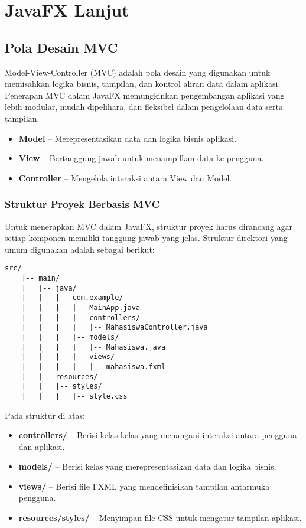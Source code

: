 \chapter{JavaFX Lanjut}

\section{Pola Desain MVC}

Model-View-Controller (MVC) adalah pola desain yang digunakan untuk memisahkan logika bisnis, tampilan, dan kontrol aliran data dalam aplikasi. Penerapan MVC dalam JavaFX memungkinkan pengembangan aplikasi yang lebih modular, mudah dipelihara, dan fleksibel dalam pengelolaan data serta tampilan.

\begin{itemize}
	\item \textbf{Model} – Merepresentasikan data dan logika bisnis aplikasi.
	\item \textbf{View} – Bertanggung jawab untuk menampilkan data ke pengguna.
	\item \textbf{Controller} – Mengelola interaksi antara View dan Model.
\end{itemize}

\subsection{Struktur Proyek Berbasis MVC}

Untuk menerapkan MVC dalam JavaFX, struktur proyek harus dirancang agar setiap komponen memiliki tanggung jawab yang jelas. Struktur direktori yang umum digunakan adalah sebagai berikut:

\begin{lstlisting}[style=JavaStyle, caption=Struktur Direktori dalam JavaFX MVC]
	src/
	|-- main/
	|   |-- java/
	|   |   |-- com.example/
	|   |   |   |-- MainApp.java
	|   |   |   |-- controllers/
	|   |   |   |   |-- MahasiswaController.java
	|   |   |   |-- models/
	|   |   |   |   |-- Mahasiswa.java
	|   |   |   |-- views/
	|   |   |   |   |-- mahasiswa.fxml
	|   |-- resources/
	|   |   |-- styles/
	|   |   |   |-- style.css
\end{lstlisting}


Pada struktur di atas:
\begin{itemize}
	\item \textbf{controllers/} – Berisi kelas-kelas yang menangani interaksi antara pengguna dan aplikasi.
	\item \textbf{models/} – Berisi kelas yang merepresentasikan data dan logika bisnis.
	\item \textbf{views/} – Berisi file FXML yang mendefinisikan tampilan antarmuka pengguna.
	\item \textbf{resources/styles/} – Menyimpan file CSS untuk mengatur tampilan aplikasi.
\end{itemize}

